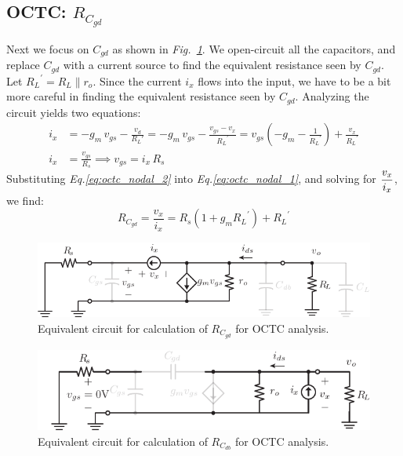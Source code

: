 \subsection{OCTC: \texorpdfstring{$R_{C_{gd}}$}{Equivalent Gate-Drain Capacitor Resistance}}
Next we focus on $C_{gd}$ as shown in \emph{Fig.~\ref{fig:cs_amp_ac_caps_Cgd}}.  We open-circuit all the capacitors, and replace $C_{gd}$ with a current source to find the equivalent resistance seen by $C_{gd}$.  Let ${R_L}^{'} = R_L \parallel r_o$.  Since the current $i_x$ flows into the input, we have to be a bit more careful in finding the equivalent resistance seen by $C_{gd}$.  Analyzing the circuit yields two equations:
    \begin{align} 
        i_x &= -g_m\,v_{gs} - \frac{v_d}{R_L'} = -g_m\,v_{gs} - \frac{v_{gs} - v_x}{{R_L}^{'}}
                = v_{gs}\left(-g_m - \frac{1}{{R_L}^{'}}\right) + \frac{v_x}{{R_L}^{'}}
        \label{eq:octc_nodal_1}\\[0.25cm]
        i_x &= \frac{v_{gs}}{R_s} \implies v_{gs} = i_x\,R_s
        \label{eq:octc_nodal_2}
    \end{align}
Substituting \emph{Eq.\ref{eq:octc_nodal_2}} into \emph{Eq.\ref{eq:octc_nodal_1}}, and solving for $\mathlarger{\frac{v_x}{i_x}}$, we find:
    \begin{equation}
        \boxed{R_{C_{gd}} = \frac{v_x}{i_x} = R_{s}(1 + {g_m}{R_L}^{'}) + {R_L}^{'}}
    \end{equation}
\newpage
\begin{figure}[t]
\centering
\includegraphics[scale=1.05]{cs_amp_ac_caps_Cgd}
\caption{Equivalent circuit for calculation of $R_{C_{gd}}$ for OCTC analysis.}
\label{fig:cs_amp_ac_caps_Cgd}
\end{figure}
\begin{figure}[H]
\centering
\includegraphics[scale=1.15]{cs_amp_ac_caps_Cdb}
\caption{Equivalent circuit for calculation of $R_{C_{db}}$ for OCTC analysis.}
\label{fig:cs_amp_ac_caps_Cdb}
\end{figure}

